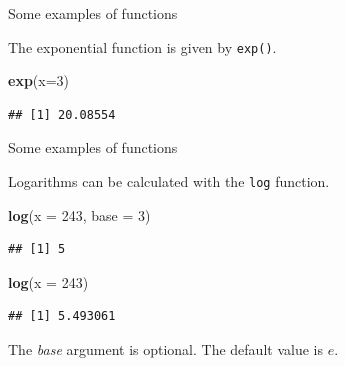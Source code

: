 \documentclass[ignorenonframetext,]{beamer}
\newenvironment{Shaded}{\begin{snugshade}}{\end{snugshade}}
\newcommand{\DataTypeTok}[1]{\textcolor[rgb]{0.13,0.29,0.53}{#1}}
\newcommand{\DecValTok}[1]{\textcolor[rgb]{0.00,0.00,0.81}{#1}}
\newcommand{\KeywordTok}[1]{\textcolor[rgb]{0.13,0.29,0.53}{\textbf{#1}}}
\newcommand{\NormalTok}[1]{#1}
\begin{document}
\begin{frame}[fragile]{Some examples of functions}
\protect\hypertarget{some-examples-of-functions}{}

The exponential function is given by \texttt{exp()}.

\begin{Shaded}
\begin{Highlighting}[]
\KeywordTok{exp}\NormalTok{(}\DataTypeTok{x=}\DecValTok{3}\NormalTok{)}
\end{Highlighting}
\end{Shaded}

\begin{verbatim}
## [1] 20.08554
\end{verbatim}

\end{frame}

\begin{frame}[fragile]{Some examples of functions}
\protect\hypertarget{some-examples-of-functions-1}{}

Logarithms can be calculated with the \texttt{log} function.

\begin{Shaded}
\begin{Highlighting}[]
\KeywordTok{log}\NormalTok{(}\DataTypeTok{x =} \DecValTok{243}\NormalTok{, }\DataTypeTok{base =} \DecValTok{3}\NormalTok{)}
\end{Highlighting}
\end{Shaded}

\begin{verbatim}
## [1] 5
\end{verbatim}

\begin{Shaded}
\begin{Highlighting}[]
\KeywordTok{log}\NormalTok{(}\DataTypeTok{x =} \DecValTok{243}\NormalTok{)}
\end{Highlighting}
\end{Shaded}

\begin{verbatim}
## [1] 5.493061
\end{verbatim}

The \textit{base} argument is optional. The default value is \(e\).

\end{frame}
\end{document}

